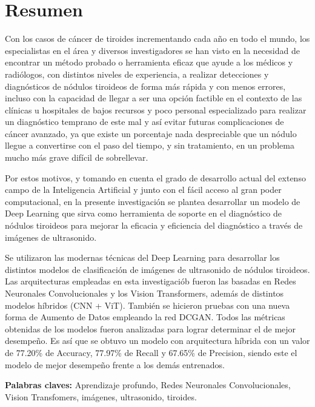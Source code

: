 
\chapter*{Resumen}

Con los casos de cáncer de tiroides incrementando cada año en todo el mundo, los especialistas en el área y diversos investigadores se han visto en la necesidad de encontrar un método probado o herramienta eficaz que ayude a los médicos y radiólogos, con distintos niveles de experiencia, a realizar detecciones y diagnósticos de nódulos tiroideos de forma más rápida y con menos errores, incluso con la capacidad de llegar a ser una opción factible en el contexto de las clínicas u hospitales de bajos recursos y poco personal especializado para realizar un diagnóstico temprano de este mal y así evitar futuras complicaciones de cáncer avanzado, ya que existe un porcentaje nada despreciable que un nódulo llegue a convertirse con el paso del tiempo, y sin tratamiento, en un problema mucho más grave difícil de sobrellevar. 

Por estos motivos, y tomando en cuenta el grado de desarrollo actual del extenso campo de la Inteligencia Artificial y junto con el fácil acceso al gran poder computacional, en la presente investigación se plantea desarrollar un modelo de Deep Learning que sirva como herramienta de soporte en el diagnóstico de nódulos tiroideos para mejorar la eficacia y eficiencia del diagnóstico a través de imágenes de ultrasonido.

Se utilizaron las modernas técnicas del Deep Learning para desarrollar los distintos modelos de clasificación de imágenes de ultrasonido de nódulos tiroideos. Las arquitecturas empleadas en esta investigaciób fueron las basadas en Redes Neuronales Convolucionales y los Vision Transformers, además de distintos modelos híbridos (CNN + ViT). También se hicieron pruebas con una nueva forma de Aumento de Datos empleando la red DCGAN. Todos las métricas obtenidas de los modelos fueron analizadas para lograr determinar el de mejor desempeño. Es así que se obtuvo un modelo con arquitectura híbrida con un valor de 77.20\% de Accuracy, 77.97\% de Recall y 67.65\% de Precision, siendo este el modelo de mejor desempeño frente a los demás entrenados.
\newline

\textbf{Palabras claves: } Aprendizaje profundo, Redes Neuronales Convolucionales, Vision Transfomers, imágenes, ultrasonido, tiroides.


